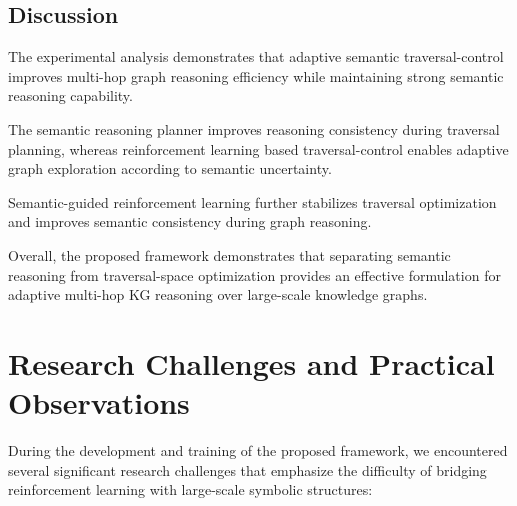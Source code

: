 \documentclass[10pt,conference]{IEEEtran}
\begin{document}
\subsection{Discussion}

The experimental analysis demonstrates that adaptive semantic traversal-control improves multi-hop graph reasoning efficiency while maintaining strong semantic reasoning capability.

The semantic reasoning planner improves reasoning consistency during traversal planning, whereas reinforcement learning based traversal-control enables adaptive graph exploration according to semantic uncertainty.

Semantic-guided reinforcement learning further stabilizes traversal optimization and improves semantic consistency during graph reasoning.

Overall, the proposed framework demonstrates that separating semantic reasoning from traversal-space optimization provides an effective formulation for adaptive multi-hop KG reasoning over large-scale knowledge graphs.





\section{Research Challenges and Practical Observations}

During the development and training of the proposed framework, we encountered several significant research challenges that emphasize the difficulty of bridging reinforcement learning with large-scale symbolic structures:
\end{document}
